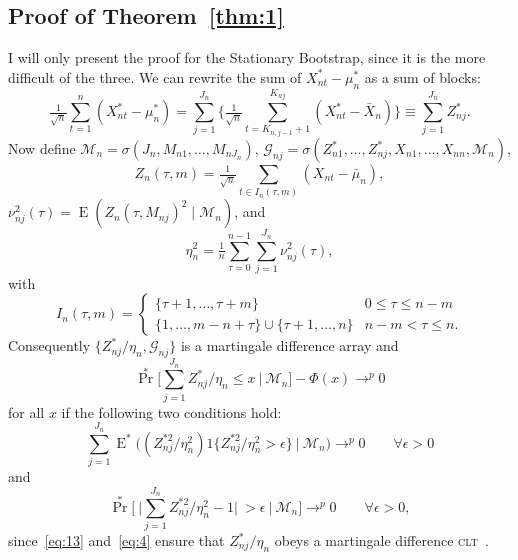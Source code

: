 \documentclass[11pt]{article}
\theoremstyle{definition}
\DeclareMathOperator{\E}{E}
\DeclareMathOperator{\pr}{Pr}
\newcommand{\clt}{\textsc{clt}}
\begin{document}
\subsection*{Proof of Theorem~\ref{thm:1}}
I will only present the proof for the Stationary Bootstrap, since it
is the more difficult of the three.
We can rewrite the sum of $X_{nt}^{*} - \mu_n^{*}$ as a sum of blocks:
\begin{equation}\label{eq:1}
  \tfrac{1}{\sqrt{n}} \sum_{t=1}^n (X_{nt}^{*} - \mu_n^{*}) = \sum_{j=1}^{J_n} \Big\{\tfrac{1}{\sqrt{n}} \sum_{t = K_{n,j-1} +
    1}^{K_{nj}} (X_{nt}^{*} - \bar X_n)\Big\} \equiv 
  \sum_{j=1}^{J_n} Z_{nj}^{*}.
\end{equation}
Now define $\mathcal{M}_{n}=\sigma(J_{n}, M_{n1},\dots,M_{nJ_n})$,
$\mathcal{G}_{nj} = \sigma(Z_{n1}^{*},\dots, Z_{nj}^{*},
X_{n1},\dots,X_{nn}, \mathcal{M}_n)$,
  \begin{equation}\label{eq:18}
    Z_n(\tau, m) = \tfrac{1}{\sqrt{n}} \sum_{t\in I_n(\tau, m)} (X_{nt} - \bar \mu_n),
  \end{equation}
$\nu_{nj}^2(\tau) = \E(Z_n(\tau, M_{nj})^2 \mid \mathcal M_n)$, and
  \begin{equation}\label{eq:26}
    \eta_n^{2} = \tfrac{1}{n} \sum_{\tau=0}^{n-1} \sum_{j=1}^{J_n} \nu_{nj}^2(\tau),
  \end{equation}
with
\begin{equation}
  \label{eq:3}
  I_n(\tau, m) = \begin{cases}
    \{\tau + 1,\dots, \tau + m\} & 0 \leq \tau \leq n - m \\
    \{1,\dots, m - n + \tau\} \cup \{\tau + 1,\dots, n\} & n - m < \tau \leq n.
  \end{cases}
\end{equation}
  Consequently $\{Z_{nj}^{*} / \eta_n, \mathcal{G}_{nj}\}$ is a martingale
  difference array and
\begin{equation}
  \label{eq:6}
  \pr^{*} \Big[ \sum_{j=1}^{J_n}
  Z_{nj}^{*} / \eta_n \leq x \ \Big|\ \mathcal{M}_{n}\Big] - \Phi(x) \to^p 0
\end{equation}
for all $x$ if the following two conditions hold:
\begin{equation}
  \label{eq:13}
  \sum_{j=1}^{J_n} \E^{*}\big( (Z_{nj}^{*2}/\eta_n^{2}) 1\{Z_{nj}^{*2}/\eta_n^{2}  >
  \epsilon\} \ \big|\ \mathcal{M}_n\big) \to^p 0 \qquad \forall \epsilon > 0
\end{equation}
and 
\begin{equation}
  \label{eq:4}
  \pr^{*}\Big[\ \Big|\sum_{j=1}^{J_n} Z_{nj}^{*2}/ \eta_n^{2} - 1
  \Big|\ > \epsilon \ \Big|\ \mathcal{M}_n \Big] \to^p 0 \qquad \forall \epsilon > 0,
\end{equation}
since~\eqref{eq:13} and~\eqref{eq:4} ensure that $Z_{nj}^{*}/\eta_n$ obeys a
martingale difference \clt\ \citep[e.g.][Theorem
3.3]{HaH:80}.  
\end{document}
